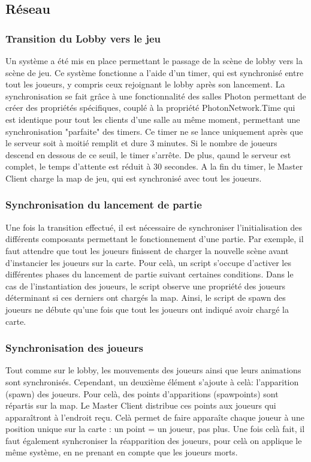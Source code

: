 \subsection{Réseau}

    \subsubsection{Transition du Lobby vers le jeu}
    
        Un système a été mis en place permettant le passage de la scène de lobby vers la scène de jeu.
        Ce système fonctionne a l'aide d'un timer, qui est synchronisé entre tout les joueurs, y compris ceux
        rejoignant le lobby après son lancement. La synchronisation se fait grâce à une fonctionnalité des salles Photon
        permettant de créer des propriétés spécifiques, couplé à la propriété PhotonNetwork.Time qui
        est identique pour tout les clients d'une salle au même moment, permettant une synchronisation
        "parfaite" des timers.
        Ce timer ne se lance uniquement après que le serveur soit à moitié remplit et dure 3 minutes. Si le nombre de joueurs descend en dessous de ce seuil, le timer s'arrête. De plus, qaund le serveur
        est complet, le temps d'attente est réduit à 30 secondes.
        A la fin du timer, le Master Client charge la map de jeu, qui est synchronisé avec tout les joueurs.
    
    \subsubsection{Synchronisation du lancement de partie}
        Une fois la transition effectué, il est nécessaire de synchroniser l'initialisation des différents composants
        permettant le fonctionnement d'une partie. Par exemple, il faut attendre que tout les joueurs finissent de charger
        la nouvelle scène avant d'instancier les joueurs sur la carte. Pour celà, un script s'occupe d'activer les différentes phases
        du lancement de partie suivant certaines conditions. Dans le cas de l'instantiation des joueurs, le script observe une propriété
        des joueurs déterminant si ces derniers ont chargés la map. Ainsi, le script de spawn des joueurs ne débute qu'une fois que tout les joueurs
        ont indiqué avoir chargé la carte.

    \subsubsection{Synchronisation des joueurs}
        Tout comme sur le lobby, les mouvements des joueurs ainsi que leurs animations sont synchronisés. Cependant,
        un deuxième élément s'ajoute à celà: l'apparition (spawn) des joueurs. Pour celà, des points d'apparitions (spawpoints)
        sont répartis sur la map. Le Master Client distribue ces points aux joueurs qui apparaîtront à l'endroit reçu. Celà permet
        de faire apparaîte chaque joueur à une position unique sur la carte : un point = un joueur, pas plus. Une fois celà fait,
        il faut également synhcroniser la réapparition des joueurs, pour celà on applique le même système, en ne prenant en compte que les joueurs
        morts.

